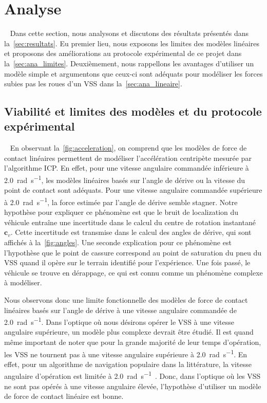 \section{Analyse}~\label{sec:analyse}
Dans cette section, nous analysons et discutons des résultats présentés dans la~\autoref{sec:resultats}.
Eu premier lieu, nous exposons les limites des modèles linéaires et proposons des améliorations au protocole expérimental de ce projet dans la~\autoref{sec:ana_limites}.
Deuxièmement, nous rappellons les avantages d'utiliser un modèle simple et argumentons que ceux-ci sont adéquats pour modéliser les forces subies pas les roues d'un \ac{VSS} dans la~\autoref{sec:ana_lineaire}.

\subsection{Viabilité et limites des modèles et du protocole expérimental}~\label{sec:ana_limites}
En observant la~\autoref{fig:acceleration}, on comprend que les modèles de force de contact linéaires permettent de modéliser l'accélération centripète mesurée par l'algorithme \ac{ICP}.
En effet, pour une vitesse angulaire commandée inférieure à \SI{2.0}{\radian\per\second}, les modèles linéaires basés sur l'angle de dérive ou la vitesse du point de contact sont adéquats.
Pour une vitesse angulaire commandée supérieure à \SI{2.0}{\radian\per\second}, la force estimée par l'angle de dérive semble stagner. 
Notre hypothèse pour expliquer ce phénomène est que le bruit de localization du véhicule entraîne une incertitude dans le calcul du centre de rotation instantané $\bm c_v$.
Cette incertitude est transmise dans le calcul des angles de dérive, qui sont affichés à la~\autoref{fig:angles}.
Une seconde explication pour ce phénomène est l'hypothèse que le point de cassure correspond au point de saturation du pneu du \ac{VSS} quand il opère sur le terrain identifié pour l'expérience.
Une fois passé, le véhicule se trouve en dérappage, ce qui est connu comme un phénomène complexe à modéliser.

Nous observons donc une limite fonctionnelle des modèles de force de contact linéaires basés sur l'angle de dérive à une vitesse angulaire commandée de \SI{2.0}{\radian\per\second}.
Dans l'optique où nous désirons opérer le \ac{VSS} à une vitesse angulaire supérieure, un modèle plus complexe devrait être étudié.
Il est quand même important de noter que pour la grande majorité de leur temps d'opération, les \ac{VSS} ne tournent pas à une vitesse angulaire supérieure à \SI{2.0}{\radian\per\second}.
En effet, pour un algorithme de navigation populaire dans la littérature, la vitesse angulaire d'opération est limitée à \SI{2.0}{\radian\per\second}~\citep{Huskic2019}.
Donc, dans l'optique où les \ac{VSS} ne sont pas opérés à une vitesse angulaire élevée, l'hypothèse d'utiliser un modèle de force de contact linéaire est bonne.

